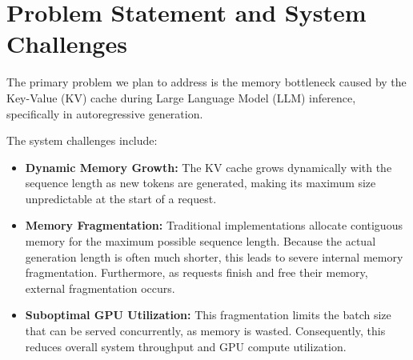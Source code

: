 \documentclass{article}
\begin{document}

\section{Problem Statement and System Challenges}
\label{sec:problem}

The primary problem we plan to address is the memory bottleneck caused by the Key-Value (KV) cache during Large Language Model (LLM) inference, specifically in autoregressive generation. 

The system challenges include:
\begin{itemize}
    \item \textbf{Dynamic Memory Growth:} The KV cache grows dynamically with the sequence length as new tokens are generated, making its maximum size unpredictable at the start of a request.
    \item \textbf{Memory Fragmentation:} Traditional implementations allocate contiguous memory for the maximum possible sequence length. Because the actual generation length is often much shorter, this leads to severe internal memory fragmentation. Furthermore, as requests finish and free their memory, external fragmentation occurs.
    \item \textbf{Suboptimal GPU Utilization:} This fragmentation limits the batch size that can be served concurrently, as memory is wasted. Consequently, this reduces overall system throughput and GPU compute utilization.
\end{itemize}
\end{document}
